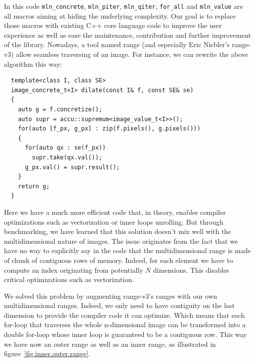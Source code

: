 In this code \texttt{mln\_concrete}, \texttt{mln\_piter}, \texttt{mln\_qiter}, \texttt{for\_all} and \texttt{mln\_value}
are all macros aiming at hiding the underlying complexity. Our goal is to replace those macros with existing C++ core
language code to improve the user experience as well as ease the maintenance, contribution and further improvement of
the library. Nowadays, a tool named range (and especially Eric Niebler's range-v3) allow seamless traversing of an
image. For instance, we can rewrite the above algorithm this way:

\begin{verbatim}
  template<class I, class SE>
  image_concrete_t<I> dilate(const I& f, const SE& se)
  {
    auto g = f.concretize();
    auto supr = accu::supremum<image_value_t<I>>();
    for(auto [f_px, g_px] : zip(f.pixels(), g.pixels()))
    {
      for(auto qx : se(f_px))
        supr.take(qx.val());
      g_px.val() = supr.result();
    }
    return g;
  }
\end{verbatim}

Here we have a much more efficient code that, in theory, enables compiler optimizations such as vectorization or inner
loops unrolling. But through benchmarking, we have learned that this solution doesn't mix well with the multidimensional
nature of images. The issue originates from the fact that we have no way to explicitly say in the code that the
multidimensional range is made of chunk of contiguous rows of memory. Indeed, for each element we have to compute an
index originating from potentially $N$ dimensions. This disables critical optimizations such as vectorization.

We solved this problem by augmenting range-v3's ranges with our own multidimensional ranges. Indeed, we only need to
have contiguity on the last dimension to provide the compiler code it can optimize. Which means that each for-loop that
traverses the whole n-dimensional image can be transformed into a double for-loop whose inner loop is guaranteed to be a
contiguous row. This way we have now an outer range as well as an inner range, as illustrated in
figure~\ref{fig.inner.outer.range}.

